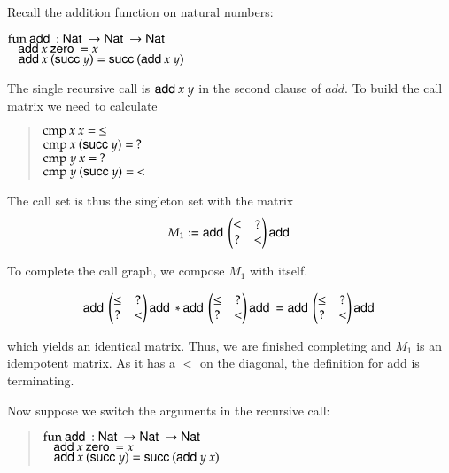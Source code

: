 Recall the addition function on natural numbers:

\begin{bsp}
$\mathrm{fun}\: \mathsf{add}\: : \mathsf{Nat}\: \rightarrow \mathsf{Nat}\: \rightarrow \mathsf{Nat}\:$\\
$\hspace*{3mm} \mathsf{add}\: x \: \mathsf{zero}\: = x $\\
$\hspace*{3mm} \mathsf{add}\: x \: (\mathsf{succ}\: y) = \mathsf{succ}\: (\mathsf{add}\: x \: y)  $
\end{bsp}
The single recursive call is $\mathsf{add}\: x \: y$ in the second clause of $add$.
To build the call matrix we need to calculate
\begin{quote}
$\mathrm{cmp} \: x \: x = \: \leq $\\
$\mathrm{cmp} \: x \: (\mathsf{succ}\: y) = \: ? $\\
$\mathrm{cmp} \: y \: x = \: ? $\\
$\mathrm{cmp} \: y \: (\mathsf{succ}\: y) = \: < $ 
\end{quote}

\noindent The call set is thus the singleton set with the matrix
\[
M_1 := \mathsf{add}\:\begin{pmatrix}
\leq & ? \\
?    & < \\
\end{pmatrix}\mathsf{add}\:
\]

\noindent To complete the call graph, we compose $M_1$ with itself.

\[
\mathsf{add}\:\begin{pmatrix}
\leq & ? \\
?    & < \\
\end{pmatrix}\mathsf{add}\:
* 
\mathsf{add}\:\begin{pmatrix}
\leq & ? \\
?    & < \\
\end{pmatrix}\mathsf{add}\:
=
\mathsf{add}\:\begin{pmatrix}
\leq & ? \\
?    & < \\
\end{pmatrix}\mathsf{add}\:
\]

\noindent which yields an identical matrix.
Thus, we are finished completing and $M_1$ is an idempotent matrix.
As it has a $<$ on the diagonal, the definition for add is terminating.

\noindent Now suppose we switch the arguments in the recursive call:
\begin{quote}
$\mathrm{fun}\: \mathsf{add}\: : \mathsf{Nat}\: \rightarrow \mathsf{Nat}\: \rightarrow \mathsf{Nat}\:$\\
$\hspace*{3mm} \mathsf{add}\: x \: \mathsf{zero}\: = x $\\
$\hspace*{3mm} \mathsf{add}\: x \: (\mathsf{succ}\: y) = \mathsf{succ}\: (\mathsf{add}\: y \: x)  $
\end{quote}

